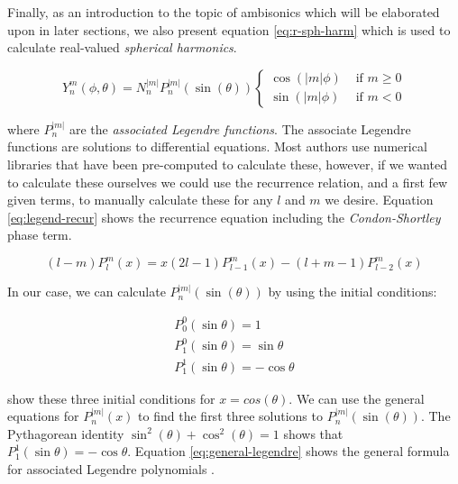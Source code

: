 Finally, as an introduction to the topic of ambisonics which will be elaborated upon in later sections, we also present equation \ref{eq:r-sph-harm} which is used to calculate real-valued \textit{spherical harmonics}.

\begin{equation}
Y_{n}^{m}(\phi, \theta)=N_{n}^{|m|} P_{n}^{|m|}(\sin (\theta))\left\{\begin{array}{ll}
\cos (|m| \phi) & \text { if } m \geq 0 \\
\sin (|m| \phi) & \text { if } m<0
\end{array}\right.
\label{eq:r-sph-harm}
\end{equation}

where $P_{n}^{|m|}$ are the \textit{associated Legendre functions}. The associate Legendre functions are solutions to differential equations. Most authors use numerical libraries that have been pre-computed to calculate these, however, if we wanted to calculate these ourselves we could use the recurrence relation, and a first few given terms, to manually calculate these for any $l$ and $m$ we desire. Equation \ref{eq:legend-recur} shows the recurrence equation including the \textit{Condon-Shortley} phase term.


\begin{equation}
(l-m) P_{l}^{m}(x)=x(2 l-1) P_{l-1}^{m}(x)-(l+m-1) P_{l-2}^{m}(x)
\label{eq:legend-recur}
\end{equation}

In our case, we can calculate $P_{n}^{|m|}(\sin (\theta))$ by using the initial conditions: 

\begin{equation}
\begin{array}{l}
P_{0}^{0}(\sin \theta)=1 \\
P_{1}^{0}(\sin \theta)=\sin \theta \\
P_{1}^{1}(\sin \theta)=-\cos \theta
\end{array}
\end{equation}

\cite{Associat51online} show these three initial conditions for $x = cos(\theta)$. We can use the general equations for $P_{n}^{|m|}(x)$ to find the first three solutions to $P_{n}^{|m|}(\sin (\theta))$. The Pythagorean identity $\sin ^{2}(\theta)+\cos ^{2}(\theta)=1$ shows that $P_{1}^{1}(\sin \theta)=-\cos \theta$. Equation \ref{eq:general-legendre} shows the general formula for associated Legendre polynomials \cite{Associat51online}.

